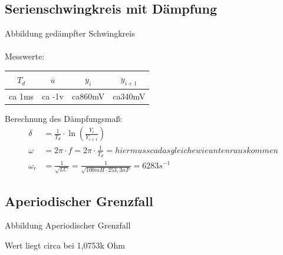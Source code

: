 \documentclass{article}
\begin{document}
\subsection{Serienschwingkreis mit Dämpfung}

Abbildung gedämpfter Schwingkreis\\\\

Messwerte:
\begin{table}[h]
  \begin{center}

    \begin{tabular}{|c|c|c|c|}
      \hline
      $T_d$  & $\overline{u}$ & $y_i$   & $y_{i+1}$ \\
      \hline
      ca 1ms & ca -1v         & ca860mV & ca340mV   \\
      \hline
    \end{tabular}
  \end{center}
\end{table}
Berechnung des Dämpfungsmaß:
\begin{align*}
  \delta   & = \frac{1}{T_d} \cdot \ln \left(\frac{Y_i}{Y_{i+1}}\right)                                \\
  \omega   & = 2\pi \cdot f = 2\pi \cdot \frac{1}{T_d} = hier muss ca das gleiche wie unten rauskommen \\
  \omega_r & = \frac{1}{\sqrt{LC}} = \frac{1}{\sqrt{100mH \cdot 253,3nF}} = 6283 s^{-1}
\end{align*}


\subsection{Aperiodischer Grenzfall}

Abbildung Aperiodischer Grenzfall

Wert liegt circa bei 1,0753k Ohm
\end{document}
